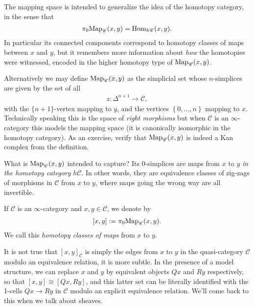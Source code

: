 \documentclass[11pt]{amsart}
\begin{document}
\begin{intuition} The mapping space is intended to generalize the idea of the homotopy category, in the sense that
\begin{align*}
    \pi_0 \mathrm{Map}_\mathscr{C}(x,y) = \mathrm{Hom}_{h\mathscr{C}}(x,y).
\end{align*}
In particular its connected components correspond to homotopy classes of maps between $x$ and $y$, but it remembers more information about \textit{how} the homotopies were witnessed, encoded in the higher homotopy type of $\mathrm{Map}_\mathscr{C}(x,y)$.
\end{intuition}




\begin{remark} 
Alternatively we may define $\mathrm{Map}_\mathscr{C}(x,y)$ as the simplicial set whose $n$-simplices are given by the set of all
\begin{align*}
    z \colon \Delta^{n+1} \to \mathscr{C},
\end{align*}
with the $\{n+1\}$-vertex mapping to $y$, and the vertices $\left\{ 0, \ldots, n \right\}$ mapping to $x$. 
Technically speaking this is the space of \textit{right morphisms} but when $\mathscr{C}$ is an $\infty$-category this models the mapping space (it is canonically isomorphic in the homotopy category). As an exercise, verify that $\mathrm{Map}_{\mathscr{C}}(x,y)$ is indeed a Kan complex from the definition.
\end{remark}

What is $\mathrm{Map}_\mathscr{C}(x,y)$ intended to capture? Its 0-simplices are maps from $x$ to $y$ \textit{in the homotopy category} $h\mathscr{C}$. In other words, they are equivalence classes of zig-zags of morphisms in $\mathscr{C}$ from $x$ to $y$, where maps going the wrong way are all invertible.

\begin{notation} If $\mathscr{C}$ is an $\infty$-category and $x,y\in\mathscr{C}$, we denote by
\begin{align*}
    \left[ x,y \right] := \pi_0 \mathrm{Map}_{\mathscr{C}}(x,y).
\end{align*}
We call this \textit{homotopy classes of maps} from $x$ to $y$.
\end{notation}

\begin{warning} It is not true that $\left[ x,y \right]_\mathscr{C}$ is simply the edges from $x$ to $y$ in the quasi-category $\mathscr{C}$ modulo an equivalence relation, it is more subtle. In the presence of a model structure, we can replace $x$ and $y$ by equivalent objects $Qx$ and $Ry$ respectively, so that $\left[ x,y \right] \cong \left[ Qx,Ry \right]$, and this latter set can be literally identified with the 1-cells $Qx \to Ry$ in $\mathscr{C}$ modulo an explicit equivalence relation. We'll come back to this when we talk about sheaves.
\end{warning}
\end{document}
